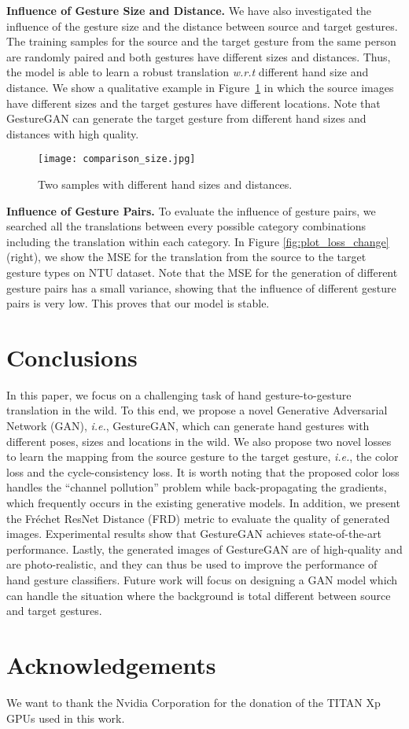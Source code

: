 \documentclass[sigconf]{acmart}
\begin{document}
\noindent\textbf{Influence of Gesture Size and Distance.} We have also investigated the influence of the gesture size and the distance between source and target gestures. The training samples for the source and the target gesture  from the same person are randomly paired and both gestures have different sizes and distances. Thus, the model is able to learn a robust translation \textit{w.r.t} different hand size and distance. 
We show a qualitative example in Figure~\ref{fig:comparison_size} in which the source images have different sizes and the target gestures have different locations. 
Note that GestureGAN can generate the target gesture from different hand sizes and distances with high quality.
\begin{figure}[!t] \tiny
	\centering
	\texttt{[image: comparison\_size.jpg]}
	\caption{\small{Two samples with different hand sizes and distances.}}
	\label{fig:comparison_size}
	\vspace{-0.3cm}
\end{figure}

\noindent\textbf{Influence of Gesture Pairs.}
To evaluate the influence of gesture pairs, we searched all the translations between every possible category combinations including the translation within each category.
In Figure \ref{fig:plot_loss_change} (right), we show the MSE for the translation from the source to the target gesture types on NTU dataset.
Note that the MSE for the generation of different gesture pairs has a small variance, showing that the influence of different gesture pairs is very low. This proves that our model is stable. 

\section{Conclusions}
\label{sec:conclusions}

In this paper, we focus on a challenging task of hand gesture-to-gesture translation in the wild.
To this end, we propose a novel Generative Adversarial Network (GAN), \textit{i.e.}, GestureGAN, which can generate  hand gestures with different poses, sizes and locations in the wild.
We also propose two novel losses to learn the mapping from the source gesture to the target gesture, \textit{i.e.}, the color loss and the cycle-consistency loss.
It is worth noting that the proposed color loss handles the ``channel pollution'' problem while back-propagating the gradients, which frequently occurs in the existing generative models.
In addition, we present the Fr\'echet ResNet Distance (FRD) metric to evaluate the quality of generated images.
Experimental results show that GestureGAN achieves state-of-the-art performance.
Lastly, the generated images of GestureGAN are of high-quality and are photo-realistic, and they can thus be used to improve the performance of hand gesture classifiers. 
Future work will focus on designing a GAN model which can handle the situation where the background is total different between source and target gestures.

\section*{Acknowledgements} We want to thank the Nvidia Corporation for the donation of the TITAN Xp GPUs used in this work.

\clearpage


\end{document}
